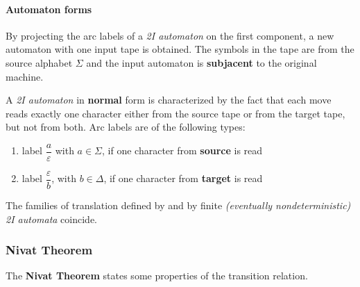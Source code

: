 \documentclass[english]{article}
\begin{document}
\paragraph{Automaton forms}

By projecting the arc labels of a \textit{2I automaton} on the first component, a new automaton with one input tape is obtained.
The symbols in the tape are from the source alphabet \(\Sigma\) and the input automaton is \textbf{subjacent} to the original machine.

A \textit{2I automaton} in \textbf{normal} form is characterized by the fact that each move reads exactly one character either from the source tape or from the target tape, but not from both.
Arc labels are of the following types:

\begin{enumerate}
  \item label \(\dfrac{a}{\varepsilon}\) with \(a \in \Sigma\), if one character from \textbf{source} is read
  \item label \(\dfrac{\varepsilon}{b}\), with \(b \in \Delta\), if one character from \textbf{target} is read
\end{enumerate}

\bigskip
The families of translation defined by \rte and by finite \textit{(eventually nondeterministic)} \textit{2I automata} coincide.

\subsubsection{Nivat Theorem}

The \textbf{Nivat Theorem} states some properties of the transition relation.
\end{document}
